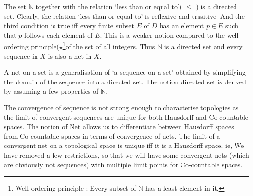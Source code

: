 \begin{remark}
\begin{commentary}
	The set \( \mathbb{N} \) together with the relation `less than or equal to'( \( \le \) ) is a directed set.
	Clearly, the relation `less than or equal to' is reflexive and trasitive.
	And the third condition is true iff every finite subset \( E \) of \( D \) has an element \( p \in E \) such that \( p \) follows each element of \( E \).
	This is a weaker notion compared to the well ordering principle($\star$\footnote{
		Well-ordering principle : Every subset of $\mathbb{N}$ has a least element in it.
	}of the set of all integers.
	Thus \( \mathbb{N} \) is a directed set and every sequence in \( X \) is also a net in \( X \).
\end{commentary}
\end{remark}

\begin{remark}
\begin{commentary}
	\par A net on a set is a generalisation of `a sequence on a set' obtained by simplifying the domain of the sequence into a directed set.
	The notion directed set is derived by assuming a few properties of \( \mathbb{N} \).\\

	\par The convergence of sequence is not strong enough to characterise topologies as the limit of convergent sequences are unique for both Hausdorff and Co-countable spaces.
	The notion of Net allows us to differentiate between Hausdorff spaces from Co-countable spaces in terms of convergence of nets.
	The limit of a convergent net on a topological space is unique iff it is a Hausdorff space.
	ie, We have removed a few restrictions, so that we will have some convergent nets (which are obviously not sequences) with multiple limit points for Co-countable spaces.
\end{commentary}
\end{remark}

